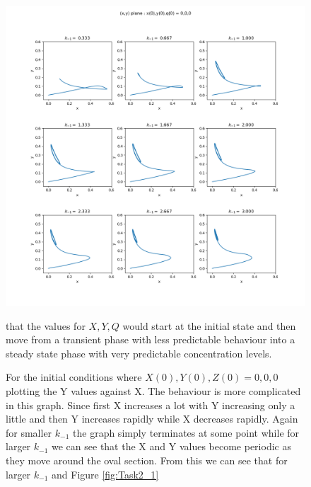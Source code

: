 \documentclass[11pt,a4paper]{CLabBookTemplate} %
\begin{document}
\begin{figure}[h!]
	\centering
	\includegraphics[width = 160mm]{Figures/Task2_2.png}
	\caption{For the initial conditions where $X(0),Y(0),Z(0) = 0,0,0$ plotting the Y values against X. The behaviour is more complicated in this graph. Since first X increases a lot with Y increasing only a little and then Y increases rapidly while X decreases rapidly. Again for smaller $k_{-1}$ the graph simply terminates at some point while for larger $k_{-1}$ we can see that the X and Y values become periodic as they move around the oval section. From this we can see that for larger $k_{-1}$ and Figure \ref{fig:Task2_1}} that the values for $X,Y,Q$ would start at the initial state and then move from a transient phase with less predictable behaviour into a steady state phase with very predictable concentration levels. 
	\label{fig:Task2_2}
\end{figure}
\end{document}
